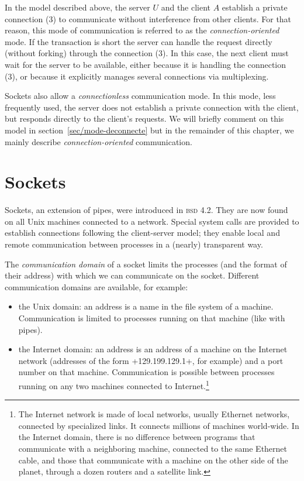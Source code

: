 In the model described above, the server $U$ and the client $A$
establish a private connection (3) to communicate without interference
from other clients. For that reason, this mode of communication is
referred to as the \emph{connection-oriented} mode. If the transaction
is short the server can handle the request directly (without forking)
through the connection (3). In this case, the next client must wait
for the server to be available, either because it is handling the
connection (3), or because it explicitly manages several connections
via multiplexing.

Sockets also allow a \emph{connectionless} communication mode.  In
this mode, less frequently used, the server does not establish a
private connection with the client, but responds directly to the
client's requests. We will briefly comment on this model in
section~\ref{sec/mode-deconnecte} but in the remainder of this
chapter, we mainly describe \emph{connection-oriented} communication.

\section{Sockets}

Sockets, an extension of pipes, were introduced in \textsc{bsd}
4.2. They are now found on all Unix machines connected to a
network. Special system calls are provided to establish connections
following the client-server model; they enable local and remote
communication between processes in a (nearly) transparent way.

The \emph{communication domain} of a socket limits the processes (and
the format of their address) with which we can communicate on the
socket. Different communication domains are available, for example:
\begin{itemize}
\item the Unix domain: an address is a name in the file system
  of a machine. Communication is limited to processes
  running on that machine (like with pipes).
%
\item the Internet domain: an address is an address of a
  machine on the Internet network (addresses of the form
  \ml+129.199.129.1+, for example) and a port number on that
  machine. Communication is possible between processes running on any
  two machines connected to Internet.\footnote{ The Internet network
    is made of local networks, usually Ethernet networks, connected by
    specialized links. It connects millions of machines world-wide. In
    the Internet domain, there is no difference between programs that
    communicate with a neighboring machine, connected to the same
    Ethernet cable, and those that communicate with a machine on the other
    side of the planet, through a dozen routers and a satellite link.}
\end{itemize}

